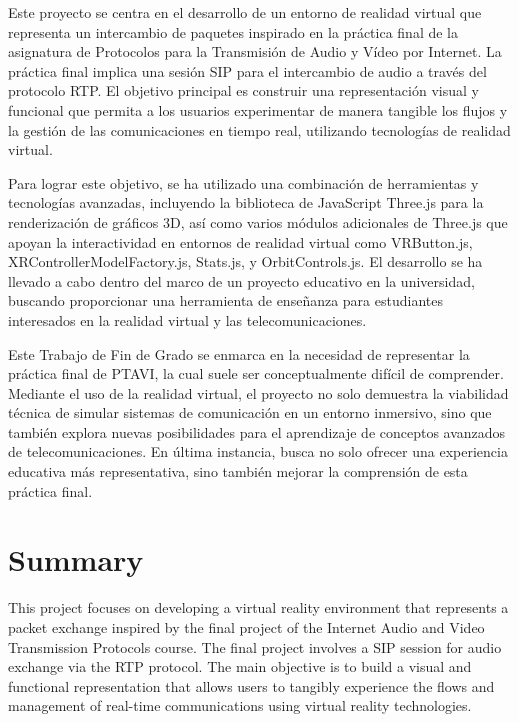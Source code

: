 \documentclass[a4paper, 12pt]{book}
\begin{document}
Este proyecto se centra en el desarrollo de un entorno de realidad virtual que representa un intercambio de paquetes inspirado en la 
práctica final de la asignatura de Protocolos para la Transmisión de Audio y Vídeo por Internet. La práctica final implica una sesión 
SIP para el intercambio de audio a través del protocolo RTP. El objetivo principal es construir una representación visual y funcional 
que permita a los usuarios experimentar de manera tangible los flujos y la gestión de las comunicaciones en tiempo real, utilizando 
tecnologías de realidad virtual.

\bigskip

Para lograr este objetivo, se ha utilizado una combinación de herramientas y tecnologías avanzadas, incluyendo la biblioteca de 
JavaScript Three.js para la renderización de gráficos 3D, así como varios módulos adicionales de Three.js que apoyan la interactividad en 
entornos de realidad virtual como VRButton.js, XRControllerModelFactory.js, Stats.js, y OrbitControls.js. El desarrollo se ha llevado a cabo dentro del marco 
de un proyecto educativo en la universidad, buscando proporcionar una herramienta de enseñanza para 
estudiantes interesados en la realidad virtual y las telecomunicaciones.

\bigskip

Este Trabajo de Fin de Grado se enmarca en la necesidad de representar la práctica final de PTAVI, la cual suele ser conceptualmente difícil de 
comprender. Mediante el uso de la realidad virtual, el proyecto no solo demuestra la viabilidad técnica de simular sistemas de comunicación 
en un entorno inmersivo, sino que también explora nuevas posibilidades para el aprendizaje de conceptos avanzados de telecomunicaciones. 
En última instancia, busca no solo ofrecer una experiencia educativa más representativa, sino también mejorar la comprensión de esta práctica final.



\chapter*{Summary}

This project focuses on developing a virtual reality environment that represents a packet exchange inspired by the final project of the Internet Audio and 
Video Transmission Protocols course. The final project involves a SIP session for audio exchange via the RTP protocol. The main objective is to build a visual 
and functional representation that allows users to tangibly experience the flows and management of real-time communications using virtual reality technologies.
\end{document}

